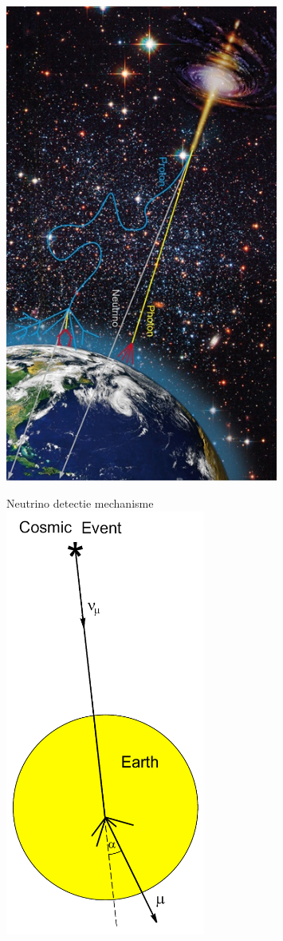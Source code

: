 \twocolumn
\begin{center}
\includegraphics[keepaspectratio,height=15.7cm]{app-vertical}
\end{center}

\newpage
\begin{center}
{\blue Neutrino detectie mechanisme}\\[5mm]
\includegraphics[keepaspectratio,height=14cm]{earth-shield}
\end{center}
